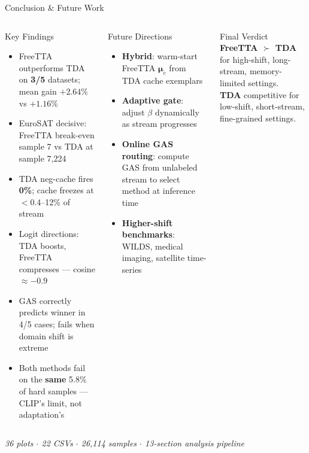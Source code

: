\documentclass[aspectratio=169,11pt]{beamer}
\newcommand{\mub}{\boldsymbol{\mu}}
\begin{document}
\begin{frame}{Conclusion \& Future Work}
\begin{columns}[T]
  \begin{block}{Key Findings}
    \begin{itemize}\footnotesize\setlength{\itemsep}{2pt}
      \item FreeTTA outperforms TDA on \textbf{3/5} datasets; mean gain $+2.64\%$ vs $+1.16\%$
      \item EuroSAT decisive: FreeTTA break-even sample 7 vs TDA at sample 7,224
      \item TDA neg-cache fires \textbf{0\%}; cache freezes at $<$0.4--12\% of stream
      \item Logit directions: TDA boosts, FreeTTA compresses — cosine $\approx -0.9$
      \item GAS correctly predicts winner in 4/5 cases; fails when domain shift is extreme
      \item Both methods fail on the \textbf{same} 5.8\% of hard samples — CLIP's limit, not adaptation's
    \end{itemize}
  \end{block}
  \begin{exampleblock}{Future Directions}
    \begin{itemize}\footnotesize\setlength{\itemsep}{2pt}
      \item \textbf{Hybrid}: warm-start FreeTTA $\mub_c$ from TDA cache exemplars
      \item \textbf{Adaptive gate}: adjust $\beta$ dynamically as stream progresses
      \item \textbf{Online GAS routing}: compute GAS from unlabeled stream to select method at inference time
      \item \textbf{Higher-shift benchmarks}: WILDS, medical imaging, satellite time-series
    \end{itemize}
  \end{exampleblock}
  \vspace{4pt}
  \begin{alertblock}{\centering\footnotesize Final Verdict}
    \centering
    \textbf{FreeTTA $\succ$ TDA} for high-shift, long-stream, memory-limited settings.\\[2pt]
    \textbf{TDA} competitive for low-shift, short-stream, fine-grained settings.
  \end{alertblock}
\end{columns}
\vspace{3pt}
\begin{center}
  \scriptsize\textit{36 plots $\cdot$ 22 CSVs $\cdot$ 26,114 samples $\cdot$ 13-section analysis pipeline}
\end{center}
\end{frame}
\end{document}
